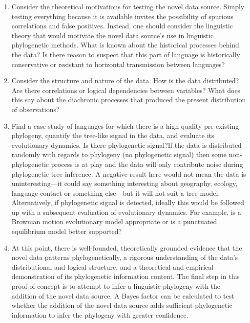 \begin{enumerate}
\def\labelenumi{\arabic{enumi}.}
\item
  Consider the theoretical motivations for testing the novel data source. Simply testing everything because it is available invites the possibility of spurious correlations and false positives. Instead, one should consider the linguistic theory that would motivate the novel data source's use in linguistic phylogenetic methods. What is known about the historical processes behind the data? Is there reason to suspect that this part of language is historically conservative or resistant to horizontal transmission between languages?
\item
  Consider the structure and nature of the data. How is the data distributed? Are there correlations or logical dependencies between variables? What does this say about the diachronic processes that produced the present distribution of observations?
\item
  Find a case study of languages for which there is a high quality pre-existing phylogeny, quantify the tree-like signal in the data, and evaluate its evolutionary dynamics. Is there phylogenetic signal?If the data is distributed randomly with regards to phylogeny (no phylogenetic signal) then some non-phylogenetic process is at play and the data will only contribute noise during phylogenetic tree inference. A negative result here would not mean the data is uninteresting---it could say something interesting about geography, ecology, language contact or something else---but it will not suit a tree model. Alternatively, if phylogenetic signal is detected, ideally this would be followed up with a subsequent evaluation of evolutionary dynamics. For example, is a Brownian motion evolutionary model appropriate or is a punctuated equilibrium model better supported?
\item
  At this point, there is well-founded, theoretically grounded evidence that the novel data patterns phylogenetically, a rigorous understanding of the data's distributional and logical structure, and a theoretical and empirical demonstration of its phylogenetic information content. The final step in this proof-of-concept is to attempt to infer a linguistic phylogeny with the addition of the novel data source. A Bayes factor can be calculated to test whether the addition of the novel data source adds sufficient phylogenetic information to infer the phylogeny with greater confidence.
\end{enumerate}


